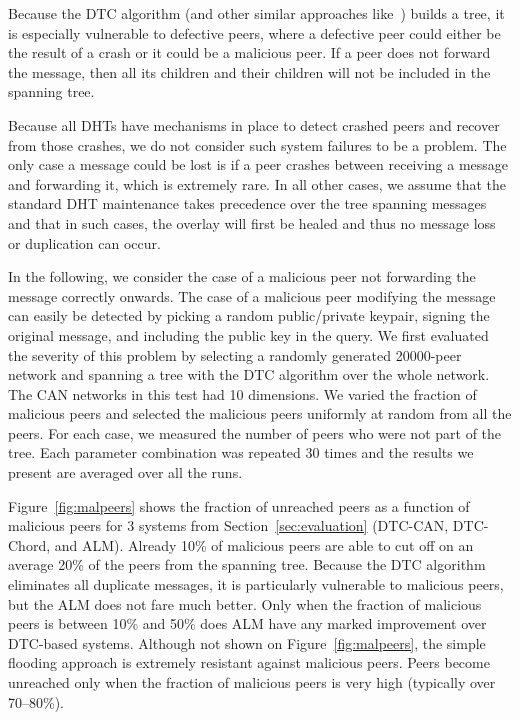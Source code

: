 \documentclass[fleqn,12pt,twoside]{article}
\begin{document}
Because the DTC algorithm (and other similar approaches
like~\cite{ratnasamy2001alm,CastroM:SplitStream}) builds a tree, it is
especially vulnerable to defective peers, where a defective peer could
either be the result of a crash or it could be a malicious peer.  If a
peer does not forward the message, then all its children and their
children will not be included in the spanning tree. 

Because all DHTs have mechanisms in place to detect crashed peers and
recover from those crashes, we do not consider such system failures to
be a problem. The only case a message could be lost is if a peer
crashes between receiving a message and forwarding it, which is
extremely rare. In all other cases, we assume that the standard DHT
maintenance takes precedence over the tree spanning messages and that
in such cases, the overlay will first be healed and thus no message
loss or duplication can occur.

In the following, we consider the case of a malicious peer not
forwarding the message correctly onwards. The case of a malicious peer
modifying the message can easily be detected by picking a random
public/private keypair, signing the original message, and including
the public key in the query.
We first evaluated the severity of this problem by selecting a
randomly generated 20000-peer network and spanning a tree with the DTC
algorithm over the whole network. The CAN networks in this test had 10
dimensions.  We varied the fraction of malicious peers and selected
the malicious peers uniformly at random from all the peers. For each
case, we measured the number of peers who were not part of the tree.
Each parameter combination was repeated 30 times and the results we
present are averaged over all the runs.

Figure~\ref{fig:malpeers} shows the fraction of unreached peers as a
function of malicious peers for 3 systems from
Section~\ref{sec:evaluation} (DTC-CAN, DTC-Chord, and ALM).  Already
10\% of malicious peers are able to cut off on an average 20\% of the
peers from the spanning tree. Because the DTC algorithm eliminates all
duplicate messages, it is particularly vulnerable to malicious peers,
but the ALM does not fare much better. Only when the fraction of
malicious peers is between 10\% and 50\% does ALM have any marked
improvement over DTC-based systems. Although not shown on
Figure~\ref{fig:malpeers}, the simple flooding approach is extremely
resistant against malicious peers. Peers become unreached only when
the fraction of malicious peers is very high (typically over
70--80\%).
\end{document}
